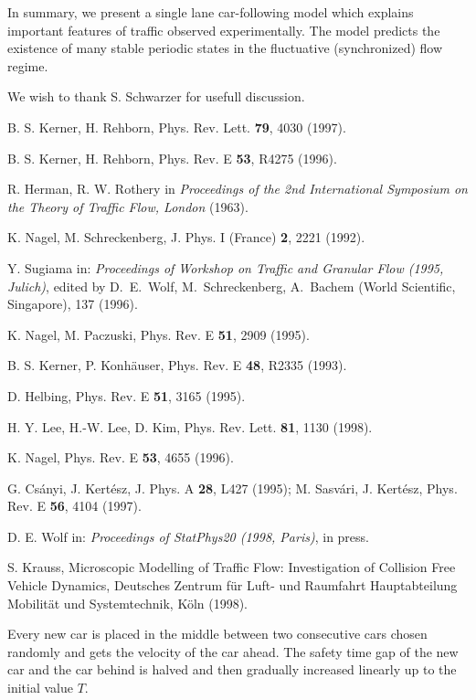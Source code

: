 In summary, we present a single lane car-following model which explains
important features of traffic observed experimentally. The model predicts the
existence of many stable periodic states in the fluctuative (synchronized)
flow regime.   

We wish to thank S. Schwarzer for usefull discussion.

\begin{references}

B. S. Kerner, H. Rehborn, Phys. Rev. Lett. {\bf 79}, 4030 (1997).  

B. S. Kerner, H. Rehborn, Phys. Rev. E {\bf 53}, R4275 (1996).

R. Herman, R. W. Rothery in {\it Proceedings of the 2nd International
Symposium on the Theory of Traffic Flow, London} (1963).   

K. Nagel, M. Schreckenberg, J. Phys. I (France) {\bf 2}, 2221 (1992).

Y. Sugiama in: {\it Proceedings of Workshop on Traffic and Granular Flow (1995,
Julich)}, edited by D.~E.~Wolf, M.~Schreckenberg, A.~Bachem (World
Scientific, Singapore), 137 (1996).

K. Nagel, M. Paczuski, Phys. Rev. E {\bf 51}, 2909 (1995).

B. S. Kerner, P. Konh\"{a}user, Phys. Rev. E {\bf 48}, R2335 (1993).

D. Helbing, Phys. Rev. E {\bf 51}, 3165 (1995).

H. Y. Lee, H.-W. Lee, D. Kim, Phys. Rev. Lett. {\bf 81}, 1130 (1998).

K. Nagel, Phys. Rev. E {\bf 53}, 4655 (1996).

G. Cs\'{a}nyi, J. Kert\'{e}sz, J. Phys. A {\bf 28}, L427 (1995); M.
Sasv\'{a}ri, J. Kert\'{e}sz, Phys. Rev. E {\bf 56}, 4104 (1997).

D. E. Wolf in: {\it Proceedings of StatPhys20 (1998, Paris)}, in press.

S. Krauss, Microscopic Modelling of Traffic Flow: Investigation of Collision
Free Vehicle Dynamics, Deutsches Zentrum f\"{u}r Luft- und Raumfahrt
Hauptabteilung Mobilit\"{a}t und Systemtechnik, K\"{o}ln (1998).

Every new car is placed in the middle between two consecutive
cars chosen randomly and gets the velocity of the car ahead. The safety time
gap of the new car and the car behind is halved and then gradually increased
linearly up to the initial value $T$. 


\end{references}
